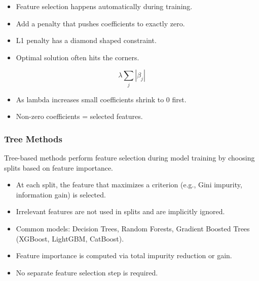 \documentclass[10pt,a4paper]{article}
\begin{document}
	\begin{itemize}
		\item Feature selection happens automatically during training.
		\item Add a penalty that pushes coefficients to exactly zero.
		\item L1 penalty has a diamond shaped constraint.
		\item Optimal solution often hits the corners.
	\end{itemize}
	
	\[
	\lambda \sum_j |\beta_j|
	\]

	\begin{itemize}
		\item As lambda increases small coefficients shrink to 0 first.
		\item Non-zero coefficients = selected features.
	\end{itemize}
	
	\subsubsection{Tree Methods}
	Tree-based methods perform feature selection during model training by choosing splits based on feature importance.
	
	\begin{itemize}
	    \item At each split, the feature that maximizes a criterion (e.g., Gini impurity, information gain) is selected.
	    \item Irrelevant features are not used in splits and are implicitly ignored.
	    \item Common models: Decision Trees, Random Forests, Gradient Boosted Trees (XGBoost, LightGBM, CatBoost).
	    \item Feature importance is computed via total impurity reduction or gain.
	    \item No separate feature selection step is required.
	\end{itemize}
\end{document}
